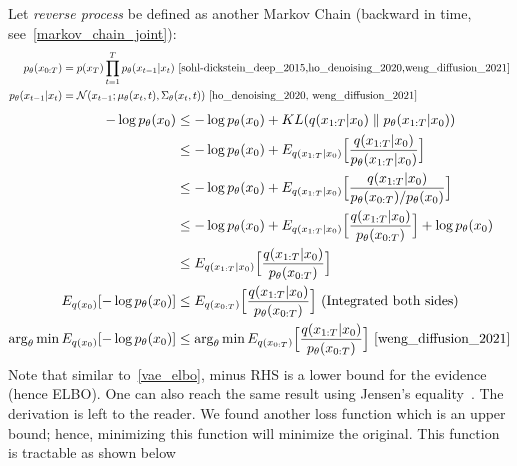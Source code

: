 \documentclass{article}
\numberwithin{equation}{subsection}
\begin{document}
Let \textit{reverse process} be defined as another Markov Chain (backward in time, see~\ref{markov_chain_joint}):
\begin{align}
    p_\theta(x_{0:T}) &= p(x_T)\prod_{t=1}^T p_\theta(x_{t-1}|x_t)~\cite{sohl-dickstein_deep_2015,ho_denoising_2020,weng_diffusion_2021}\\
    p_\theta(x_{t-1}|x_t) &= \mathcal{N}(x_{t-1}; \mu_\theta(x_t, t), \Sigma_\theta(x_t,t))~\cite{ho_denoising_2020, weng_diffusion_2021}
\end{align} 
\begin{align}
-\log p_\theta(x_0) 
&\leq -\log p_\theta(x_0)+KL(q(x_{1:T}|x_0) \parallel p_\theta(x_{1:T}|x_0))\\
&\leq -\log p_\theta(x_0)+E_{q(x_{1:T}|x_0)}\Big[\frac{q(x_{1:T}|x_0)}{p_\theta(x_{1:T}|x_0)}\Big]\\
&\leq -\log p_\theta(x_0)+E_{q(x_{1:T}|x_0)}\Big[\frac{q(x_{1:T}|x_0)}{p_\theta(x_{0:T})/p_\theta(x_0)}\Big]\\
&\leq -\log p_\theta(x_0)+E_{q(x_{1:T}|x_0)}\Big[\frac{q(x_{1:T}|x_0)}{p_\theta(x_{0:T})}\Big]+\log p_\theta(x_0)\\
&\leq E_{q(x_{1:T}|x_0)}\Big[\frac{q(x_{1:T}|x_0)}{p_\theta(x_{0:T})}\Big]\\
E_{q(x_0)}[-\log p_\theta(x_0)] &\leq E_{q(x_{0:T})}\Big[\frac{q(x_{1:T}|x_0)}{p_\theta(x_{0:T})}\Big]\ \text{(Integrated both sides)}\\
\arg_\theta \min E_{q(x_0)}[-\log p_\theta(x_0)] &\leq \arg_\theta \min E_{q(x_{0:T})}\Big[\frac{q(x_{1:T}|x_0)}{p_\theta(x_{0:T})}\Big]~\cite{weng_diffusion_2021}
\end{align}
Note that similar to~\ref{vae_elbo}, minus RHS is a lower bound for the evidence (hence ELBO). One can also reach the same result using Jensen's equality~\cite{sohl-dickstein_deep_2015,weng_diffusion_2021}. The derivation is left to the reader. We found another loss function which is an upper bound; hence, minimizing this function will minimize the original. This function is tractable as shown below
\end{document}
